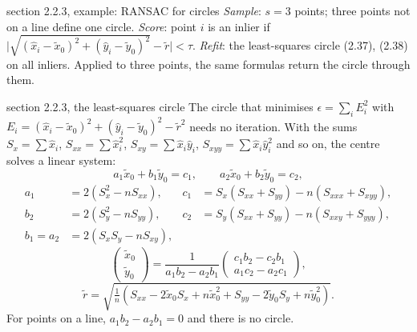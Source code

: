 \documentclass[11pt,a4paper,parskip=half]{scrartcl}
\begin{document}
\begin{script}{section 2.2.3, example: RANSAC for circles}
\emph{Sample}: \(s = 3\) points; three points not on a line define one circle.
\emph{Score}: point \(i\) is an inlier if
\(\big|\sqrt{(\hat x_i - \tilde x_0)^2 + (\hat y_i - \tilde y_0)^2} - \tilde r\big| < \tau\).
\emph{Refit}: the least-squares circle (2.37), (2.38) on all inliers. Applied to three points, the same
formulas return the circle through them.
\end{script}

\begin{script}{section 2.2.3, the least-squares circle}
The circle that minimises \(\epsilon = \sum_i E_i^2\) with
\(E_i = (\hat x_i - \tilde x_0)^2 + (\hat y_i - \tilde y_0)^2 - \tilde r^2\) needs no iteration. With the
sums \(S_x = \sum \hat x_i\), \(S_{xx} = \sum \hat x_i^2\), \(S_{xy} = \sum \hat x_i \hat y_i\),
\(S_{xyy} = \sum \hat x_i \hat y_i^2\) and so on, the centre solves a linear system:
\begin{equation}
  a_1 \tilde x_0 + b_1 \tilde y_0 = c_1, \qquad a_2 \tilde x_0 + b_2 \tilde y_0 = c_2,
  \tag{2.36}
\end{equation}
\begin{align*}
a_1 &= 2\left(S_x^2 - n S_{xx}\right), & c_1 &= S_x \left(S_{xx} + S_{yy}\right) - n \left(S_{xxx} + S_{xyy}\right),\\
b_2 &= 2\left(S_y^2 - n S_{yy}\right), & c_2 &= S_y \left(S_{xx} + S_{yy}\right) - n \left(S_{xxy} + S_{yyy}\right),\\
b_1 = a_2 &= 2\left(S_x S_y - n S_{xy}\right),
\end{align*}
\begin{equation}
  \begin{pmatrix} \tilde x_0 \\ \tilde y_0 \end{pmatrix}
  = \frac{1}{a_1 b_2 - a_2 b_1} \begin{pmatrix} c_1 b_2 - c_2 b_1 \\ a_1 c_2 - a_2 c_1 \end{pmatrix},
  \tag{2.37}
\end{equation}
\begin{equation}
  \tilde r = \sqrt{\tfrac{1}{n}\left(S_{xx} - 2\tilde x_0 S_x + n\tilde x_0^2
             + S_{yy} - 2\tilde y_0 S_y + n\tilde y_0^2\right)} .
  \tag{2.38}
\end{equation}
For points on a line, \(a_1 b_2 - a_2 b_1 = 0\) and there is no circle.
\end{script}
\end{document}

